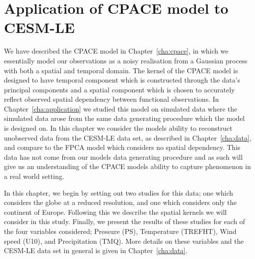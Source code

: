 
\chapter{Application of  CPACE model  to CESM-LE\label{cha:real_application}}  %

\ifpdf
    \graphicspath{{Chapter7/Figs/Raster/}{Chapter7/Figs/PDF/}{Chapter7/Figs/}}
\else
    \graphicspath{{Chapter7/Figs/Vector/}{Chapter7/Figs/}}
\fi


We have described the CPACE model in Chapter~\ref{cha:cpace}, in which we essentially model our observations as a noisy realisation from a Gaussian process with both a spatial and temporal domain.
The kernel of the CPACE model is designed to have temporal component which is constructed through the data's principal components and a spatial component which is chosen to accurately reflect observed spatial dependency between functional observations.
In Chapter~\ref{cha:application} we studied this model on simulated data where the simulated data arose from the same data generating procedure which the model is designed on.
In this chapter we consider the models ability to reconstruct unobserved data from the CESM-LE data set, as described in Chapter~\ref{cha:data}, and compare to the FPCA model which considers no spatial dependency.
This data has not come from our models data generating procedure and as such will give us an understanding of the CPACE models ability to capture phenomenon in a real world setting. 

In this chapter, we begin by setting out two studies for this data; one which considers the globe at a reduced resolution, and one which considers only the continent of Europe.
Following this we describe the spatial kernels we will consider in this study.
Finally, we present the results of these studies for each of the four variables considered; Pressure (PS), Temperature (TREFHT), Wind speed (U10), and Precipitation (TMQ).
More details on these variables and the CESM-LE data set in general is given in Chapter~\ref{cha:data}.

